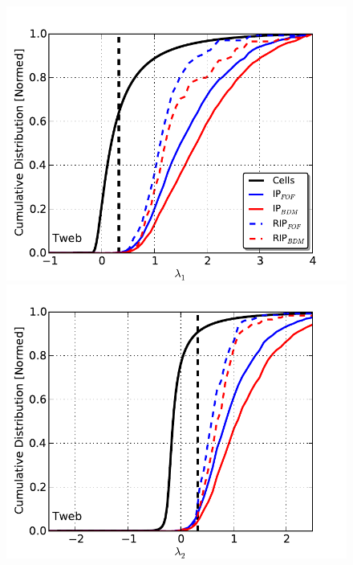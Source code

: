 \documentclass[usenatbib]{latex/mn2e}
\begin{document}
\begin{flushleft}
\begin{figure}
\begin{center}

  \includegraphics[trim = 3mm 0mm 10mm 8mm, clip, keepaspectratio=true,
  width=0.24\textheight]{./figures/eigen1_dist_Tweb}
  \includegraphics[trim = 3mm 0mm 10mm 8mm, clip, keepaspectratio=true,
  width=0.24\textheight]{./figures/eigen2_dist_Tweb}

\end{center}
\end{figure}
\end{flushleft}
\end{document}
